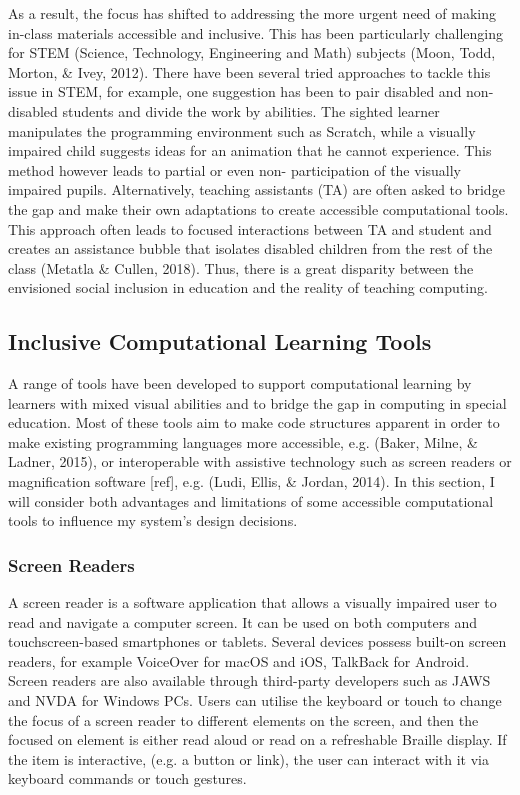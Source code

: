 \documentclass[oneside,%
                    author={Malak Hajji},
                    degree={BSc},
                    title={Designing An Accessible Computational Toolkit For Students},
                  subtitle={With Mixed Visual Abilities}]{dissertation}
\begin{document}
As a result, the focus has shifted to addressing the more urgent need of making in-class materials accessible and inclusive. This has been particularly challenging for STEM (Science, Technology, Engineering and Math) subjects (Moon, Todd, Morton, & Ivey, 2012). There have been several tried approaches to tackle this issue in STEM, for example, one suggestion has been to pair disabled and non-disabled students and divide the work by abilities. The sighted learner manipulates the programming environment such as Scratch, while a visually impaired child suggests ideas for an animation that he cannot experience. This method however leads to partial or even non- participation of the visually impaired pupils. Alternatively, teaching assistants (TA) are often asked to bridge the gap and make their own adaptations to create accessible computational tools. This approach often leads to focused interactions between TA and student and creates an assistance bubble that isolates disabled children from the rest of the class (Metatla & Cullen, 2018). Thus, there is a great disparity between the envisioned social inclusion in education and the reality of teaching computing. 

\subsection{Inclusive Computational Learning Tools}

A range of tools have been developed to support computational learning by learners with mixed visual abilities and to bridge the gap in computing in special education. Most of these tools aim to make code structures apparent in order to make existing programming languages more accessible, e.g. (Baker, Milne, & Ladner, 2015), or interoperable with assistive technology such as screen readers or magnification software [ref], e.g. (Ludi, Ellis, & Jordan, 2014). In this section, I will consider both advantages and limitations of some accessible computational tools to influence my system’s design decisions. 


\subsubsection{Screen Readers}
A screen reader is a software application that allows a visually impaired user to read and navigate a computer screen. It can be used on both computers and touchscreen-based smartphones or tablets. Several devices possess built-on screen readers, for example VoiceOver for macOS and iOS, TalkBack for Android. Screen readers are also available through third-party developers such as JAWS and NVDA for Windows PCs. 
Users can utilise the keyboard or touch to change the focus of a screen reader to different elements on the screen, and then the focused on element is either read aloud or read on a refreshable Braille display. If the item is interactive, (e.g. a button or link), the user can interact with it via keyboard commands or touch gestures.
\end{document}
